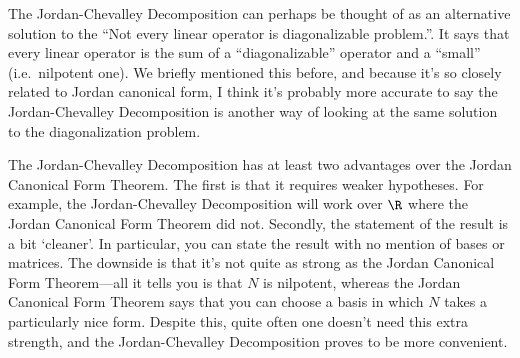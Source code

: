 The Jordan-Chevalley Decomposition can perhaps be thought of as an alternative solution to the ``Not every linear operator is diagonalizable problem.''.  It says that every linear operator is the sum of a ``diagonalizable'' operator and a ``small'' (i.e.~nilpotent one).  We briefly mentioned this before, and because it's so closely related to Jordan canonical form, I think it's probably more accurate to say the Jordan-Chevalley Decomposition is another way of looking at the same solution to the diagonalization problem.

The Jordan-Chevalley Decomposition has at least two advantages over the Jordan Canonical Form Theorem.  The first is that it requires weaker hypotheses.  For example, the Jordan-Chevalley Decomposition will work over $\R$ where the Jordan Canonical Form Theorem did not.  Secondly, the statement of the result is a bit `cleaner'.  In particular, you can state the result with no mention of bases or matrices.  The downside is that it's not quite as strong as the Jordan Canonical Form Theorem---all it tells you is that $N$ is nilpotent, whereas the Jordan Canonical Form Theorem says that you can choose a basis in which $N$ takes a particularly nice form.  Despite this, quite often one doesn't need this extra strength, and the Jordan-Chevalley Decomposition proves to be more convenient.


